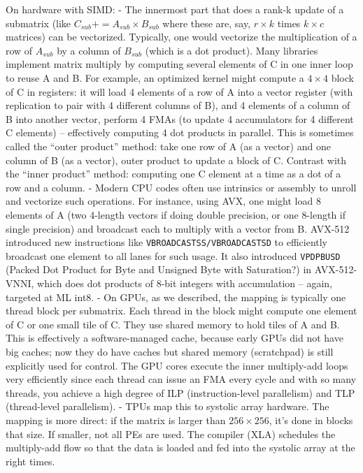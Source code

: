 On hardware with SIMD:
- The innermost part that does a rank-k update of a submatrix (like $C_{sub} += A_{sub} \times B_{sub}$ where these are, say, $r \times k$ times $k \times c$ matrices) can be vectorized. Typically, one would vectorize the multiplication of a row of $A_{sub}$ by a column of $B_{sub}$ (which is a dot product). Many libraries implement matrix multiply by computing several elements of C in one inner loop to reuse A and B. For example, an optimized kernel might compute a $4\times4$ block of C in registers: it will load 4 elements of a row of A into a vector register (with replication to pair with 4 different columns of B), and 4 elements of a column of B into another vector, perform 4 FMAs (to update 4 accumulators for 4 different C elements) – effectively computing 4 dot products in parallel. This is sometimes called the “outer product” method: take one row of A (as a vector) and one column of B (as a vector), outer product to update a block of C. Contrast with the “inner product” method: computing one C element at a time as a dot of a row and a column.
- Modern CPU codes often use intrinsics or assembly to unroll and vectorize such operations. For instance, using AVX, one might load 8 elements of A (two 4-length vectors if doing double precision, or one 8-length if single precision) and broadcast each to multiply with a vector from B. AVX-512 introduced new instructions like \texttt{VBROADCASTSS/VBROADCASTSD} to efficiently broadcast one element to all lanes for such usage. It also introduced \texttt{VPDPBUSD} (Packed Dot Product for Byte and Unsigned Byte with Saturation?) in AVX-512-VNNI, which does dot products of 8-bit integers with accumulation – again, targeted at ML int8.
- On GPUs, as we described, the mapping is typically one thread block per submatrix. Each thread in the block might compute one element of C or one small tile of C. They use shared memory to hold tiles of A and B. This is effectively a software-managed cache, because early GPUs did not have big caches; now they do have caches but shared memory (scratchpad) is still explicitly used for control. The GPU cores execute the inner multiply-add loops very efficiently since each thread can issue an FMA every cycle and with so many threads, you achieve a high degree of ILP (instruction-level parallelism) and TLP (thread-level parallelism).
- TPUs map this to systolic array hardware. The mapping is more direct: if the matrix is larger than $256\times256$, it’s done in blocks that size. If smaller, not all PEs are used. The compiler (XLA) schedules the multiply-add flow so that the data is loaded and fed into the systolic array at the right times.
